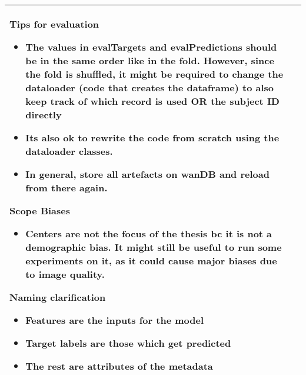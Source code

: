 \documentclass[a4paper,11pt]{article}
\begin{document}
\begin{longtable}{|p{3.5cm}|>{\vspace{-\baselineskip}}p{12cm}|}
		Tips for evaluation
		\begin{itemize}
			\item The values in evalTargets and evalPredictions should be in the same order like in the fold. However, since the fold is shuffled, it might be required to change the dataloader (code that creates the dataframe) to also keep track of which record is used OR the subject ID directly
			\item Its also ok to rewrite the code from scratch using the dataloader classes.
			\item In general, store all artefacts on wanDB and reload from there again.
		\end{itemize}
		
		Scope Biases
		\begin{itemize}
			\item Centers are not the focus of the thesis bc it is not a demographic bias. It might still be useful to run some experiments on it, as it could cause major biases due to image quality.
		\end{itemize}
		
		Naming clarification
		\begin{itemize}
			\item Features are the inputs for the model
			\item Target labels are those which get predicted
			\item The rest are attributes of the metadata
		\end{itemize} \\
		\hline
	\end{longtable}
	
\end{document}
